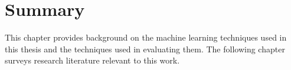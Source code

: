 





\section{Summary}
\label{sec:background-summary}

This chapter provides background on the machine learning techniques used in this thesis and the techniques used in evaluating them. The following chapter surveys research literature relevant to this work.
